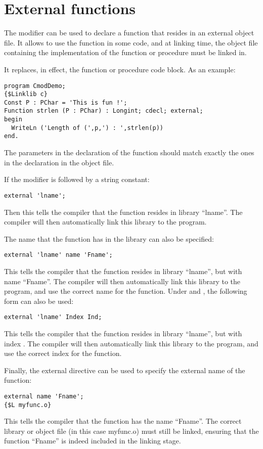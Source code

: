 \section{External functions}
\label{se:external}
The  modifier can be used to declare a function that resides in
an external object file. It allows to use the function in some code, and at
linking time, the object file containing the implementation of the function
or procedure must be linked in.

It replaces, in effect, the function or procedure code block.
As an example:
\begin{verbatim}
program CmodDemo;
{$Linklib c}
Const P : PChar = 'This is fun !';
Function strlen (P : PChar) : Longint; cdecl; external;
begin
  WriteLn ('Length of (',p,') : ',strlen(p))
end.
\end{verbatim}
\begin{remark}
The parameters in the declaration of the  function
should match exactly the ones in the declaration in the object file.
\end{remark}
If the  modifier is followed by a string constant:
\begin{verbatim}
external 'lname';
\end{verbatim}
Then this tells the compiler that the function resides in library
``lname''. The compiler will then automatically link this library to
the program.

The name that the function has in the library can also be specified:
\begin{verbatim}
external 'lname' name 'Fname';
\end{verbatim}
This tells the compiler that the function resides in library ``lname'',
but with name ``Fname''. The compiler will then automatically link this
library to the program, and use the correct name for the function.
Under \windows and \ostwo, the following form can also be used:
\begin{verbatim}
external 'lname' Index Ind;
\end{verbatim}
This tells the compiler that the function resides in library ``lname'',
but with index . The compiler will then automatically
link this library to the program, and use the correct index for the
function.

Finally, the external directive can be used to specify the external name
of the function:
\begin{verbatim}
external name 'Fname';
{$L myfunc.o}
\end{verbatim}
%
This tells the compiler that the function has the name ``Fname''. The
correct library or object file (in this case myfunc.o) must still be linked,
ensuring that the function ``Fname'' is indeed included in the linking stage.

